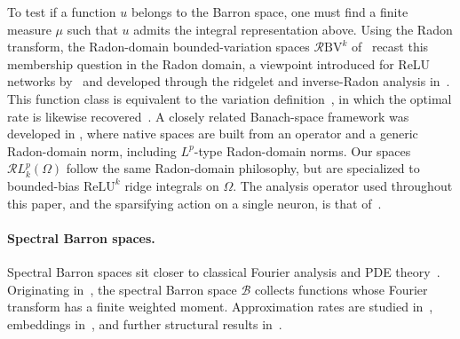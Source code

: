 \documentclass[12pt]{article}
\numberwithin{equation}{section}
\numberwithin{figure}{section}
\numberwithin{equation}{section}
\begin{document}
To test if a function $u$ belongs to the Barron space, one must find a finite measure $\mu$
such that $u$ admits the integral representation above.
Using the Radon transform,
the Radon-domain bounded-variation spaces $\mathcal{R}\mathrm{BV}^k$
of~\cite{parhi_banachspacerepresenter_2021,parhi_whatkindsfunctions_2022} recast this membership question in the Radon domain, a viewpoint introduced for ReLU
networks by~\cite{ongie_FunctionSpaceView_2019} and developed through the ridgelet
and inverse-Radon analysis in~\cite{sonoda_NeuralNetworkUnbounded_2017,%
unser_RidgesNeuralNetworks_2023,bartolucci_understandingneuralnetworks_2023}.
This function class is equivalent to the variation
definition~\cite{siegel_characterizationvariationspaces_2023}, in which the optimal
rate is likewise recovered~\cite{parhi2022ridge}.
A closely related Banach-space framework was developed in
\cite{unser_KernelMethodsNeural_2024}, where native spaces are built from an
operator and a generic Radon-domain norm, including $L^p$-type Radon-domain norms. 
 Our spaces $\mathcal{R}L^p_k(\Omega)$ follow the same
Radon-domain philosophy, but are specialized to bounded-bias
$\mathrm{ReLU}^k$ ridge integrals on $\Omega$.
The analysis operator used throughout this paper, and the sparsifying
action on a single neuron, is that
of~\cite{parhi_banachspacerepresenter_2021,parhi_whatkindsfunctions_2022}.

\paragraph{Spectral Barron spaces.}
Spectral Barron spaces sit closer to classical Fourier analysis and PDE
theory~\cite{hormander_ExistenceApproximationSolutions_2005,%
choulli_functionalanalysispartial_2025}. Originating
in~\cite{barron_universalapproximationbounds_1993}, the spectral Barron space
$\mathscr B$ collects functions whose Fourier transform has a finite weighted
moment. Approximation rates are studied
in~\cite{klusowski_approximationcombinationsrelu_2018,%
siegel_HighorderApproximationRates_2022,ma_uniformapproximationrates_2022,%
xu_finiteneuronmethod_2020}, embeddings
in~\cite{wu_embeddinginequalitiesbarrontype_2023}, and further structural results
in~\cite{meng_newfunctionspace_2022,liao_spectralbarronspace_2025a}.
\end{document}
